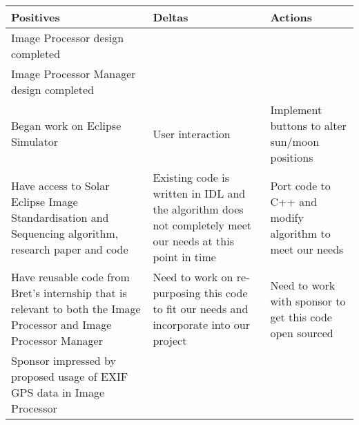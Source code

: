 \documentclass[10pt, onecolumn, draftclsnofoot, letterpaper, compsoc]{IEEEtran}
\begin{document}
\begin{table}[h]
    \centering
    \begin{tabular}{|p{.3\linewidth}|p{.3\linewidth}|p{.3\linewidth}|}

    \cline{3-3}

    \hline \textbf{Positives} & \textbf{Deltas} & \textbf{Actions} \\ \hline

    Image Processor design completed &  & \\ \hline
    Image Processor Manager design completed &  & \\ \hline
    Began work on Eclipse Simulator & User interaction & Implement buttons to alter sun/moon positions \\ \hline

    Have access to Solar Eclipse Image Standardisation and Sequencing algorithm, research paper and code
    & Existing code is written in IDL and the algorithm does not completely meet our needs at this point in time
    & Port code to C++ and modify algorithm to meet our needs \\ \hline

    Have reusable code from Bret’s internship that is relevant to both the Image Processor and Image Processor Manager
    & Need to work on re-purposing this code to fit our needs and incorporate into our project
    & Need to work with sponsor to get this code open sourced \\ \hline

    Sponsor impressed by proposed usage of EXIF GPS data in Image Processor &  & \\ \hline


    \end{tabular}
\end{table}
\end{document}
